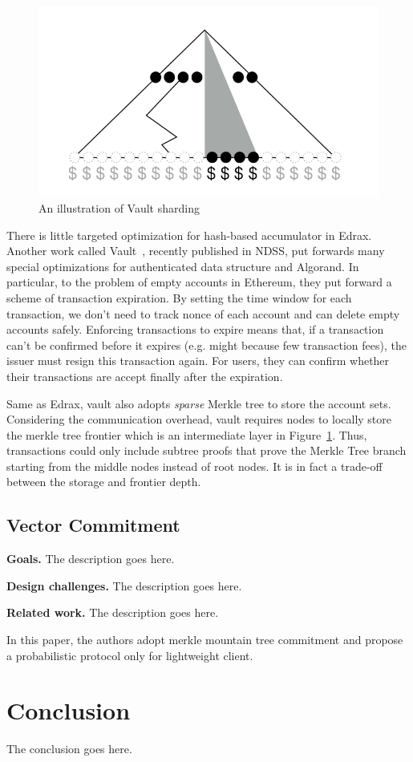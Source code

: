 \documentclass[conference]{IEEEtran}
\begin{document}
\begin{figure}[!ht]
  \centering
  \includegraphics[width=\linewidth]{figs/sharding.png}
  \caption{An illustration of Vault sharding}
  \label{sharding}
\end{figure}

There is little targeted optimization for hash-based accumulator in Edrax.
%
Another work called Vault~\cite{vault}, recently published in NDSS, put forwards many special optimizations for authenticated data structure and Algorand.
%
In particular, to the problem of empty accounts in Ethereum, they put forward a scheme of transaction expiration.
%
By setting the time window for each transaction, we don't need to track nonce of each account and can delete empty accounts safely.
%
Enforcing transactions to expire means that, if a transaction can't be confirmed before it expires (e.g. might because few transaction fees), the issuer must resign this transaction again.
%
For users, they can confirm whether their transactions are accept finally after the expiration.

Same as Edrax, vault also adopts \textit{sparse} Merkle tree to store the account sets.
%
Considering the communication overhead, vault requires nodes to locally store the merkle tree frontier which is an intermediate layer in Figure~\ref{sharding}.
%
Thus, transactions could only include subtree proofs that prove the Merkle Tree branch starting from the middle nodes instead of root nodes.
%
It is in fact a trade-off between the storage and frontier depth.

\subsection{Vector Commitment}

\textbf{Goals.} The description goes here.


\textbf{Design challenges.} The description goes here.

\textbf{Related work.} The description goes here.


%
In this paper\cite{luuflyclient}, the authors adopt merkle mountain tree commitment and propose a probabilistic protocol only for lightweight client.
%


\section{Conclusion}

The conclusion goes here.




\end{document}
